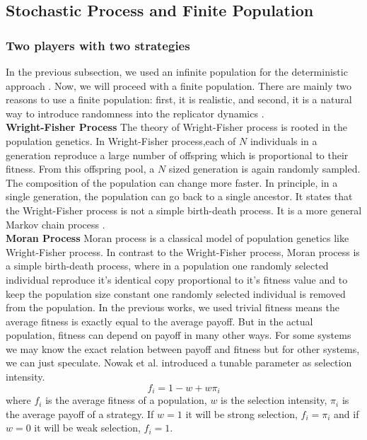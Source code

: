 \documentclass{article}
\begin{document}
\subsection{Stochastic Process and Finite Population}
\subsubsection{Two players with two strategies}
In the previous subsection, we used an infinite population for the deterministic approach \citep{Hofbauer2003}.
Now, we will proceed with a finite population.
There are mainly two reasons to use a finite population: first, it is realistic, and second, it is a natural way to introduce randomness into the replicator dynamics \citep{Altrock2010}.\\
\textbf{Wright-Fisher Process}
\newline
The theory of Wright-Fisher process is rooted in the population genetics. In Wright-Fisher process,each of $N$ individuals in a generation reproduce a large number of offspring which is proportional to their fitness.
From this offspring pool, a $N$ sized generation is again randomly sampled. The composition of the population can change more faster. In principle, in a single generation, the population can go back to a single ancestor. 
It states that the Wright-Fisher process is not a simple birth-death process. It is a more general Markov chain process \citep{Imhof2006}.\\
\textbf{Moran Process}
\newline
Moran process is a classical model of population genetics like Wright-Fisher process. In contrast to the Wright-Fisher process, Moran process is a simple birth-death process, where in a population one randomly selected individual reproduce it's identical copy proportional to it's fitness value and to keep the population size constant one randomly selected individual is removed from the population.
In the previous works, we used trivial fitness means the average fitness is exactly equal to the average payoff. But in the actual population, fitness can depend on payoff in many other ways. For some systems we may know the exact relation between payoff and fitness but for other systems, we can just speculate.
Nowak et al.\citep{Nowak2004} introduced a tunable parameter as selection intensity. 
\begin{equation}
f_i=1-w+w\pi_i \label{eq:11}
\end{equation}
where $f_i$ is the average fitness of a population, $w$ is the selection intensity, $\pi_i$ is the average payoff of a strategy. If $w=1$ it will be strong selection, $f_i=\pi_i$ and if $w=0$ it will be weak selection, $f_i=1$.\\
\end{document}
